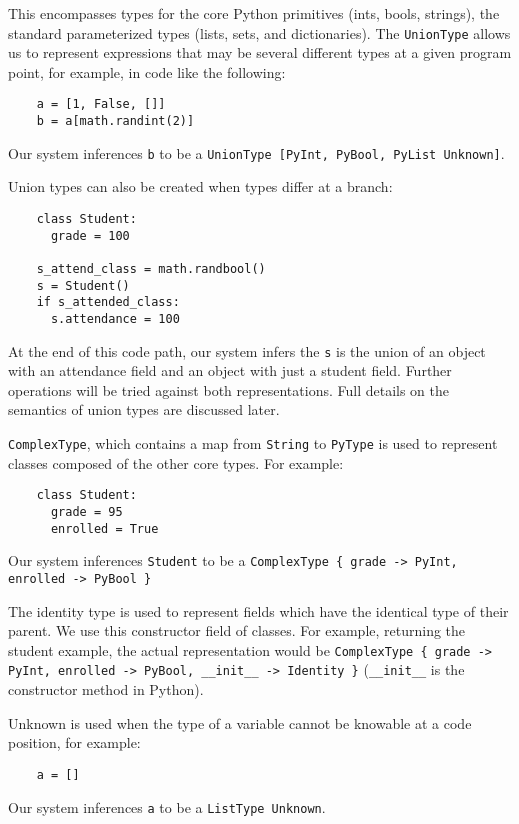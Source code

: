 \documentclass{article}[12pt]
\begin{document}
This encompasses types for the core Python primitives (ints, bools, strings), the standard
parameterized types (lists, sets, and dictionaries). The \texttt{UnionType} allows us to represent expressions that may be several different types at a given program point, for example, in code like the following:

\begin{verbatim}
    a = [1, False, []]
    b = a[math.randint(2)]
\end{verbatim}

Our system inferences \verb=b= to be a \verb=UnionType [PyInt, PyBool, PyList Unknown]=.

Union types can also be created when types differ at a branch:
\begin{verbatim}
    class Student:
      grade = 100

    s_attend_class = math.randbool()
    s = Student()
    if s_attended_class:
      s.attendance = 100
\end{verbatim}
At the end of this code path, our system infers the \texttt{s} is the union of an object with an attendance field and an
object with just a student field. Further operations will be tried against both representations. Full details on the
semantics of union types are discussed later.

\verb=ComplexType=, which contains a map from \verb=String= to \verb=PyType= is used to represent
classes composed of the other core types. For example:
\begin{verbatim}
    class Student:
      grade = 95 
      enrolled = True
\end{verbatim}

Our system inferences \verb=Student= to be a 
\verb=ComplexType { grade -> PyInt, enrolled -> PyBool }=

The identity type is used to represent fields which have the identical type of their parent. We use
this constructor field of classes. For example, returning the student example, the actual
representation would be
\verb=ComplexType { grade -> PyInt, enrolled -> PyBool, __init__ -> Identity }=
(\verb=__init__= is the constructor method in Python).

Unknown is used when the type of a variable cannot be knowable at a code position, for example:
\begin{verbatim}
    a = []
\end{verbatim}
Our system inferences \verb=a= to be a \verb=ListType Unknown=.
\end{document}
